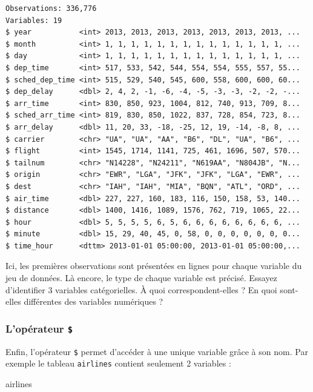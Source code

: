 \documentclass[a4paperpaper,]{article}
\newenvironment{Shaded}{\begin{snugshade}}{\end{snugshade}}
\newcommand{\NormalTok}[1]{\textcolor[rgb]{0.12,0.11,0.11}{#1}}
\begin{document}
\begin{verbatim}
Observations: 336,776
Variables: 19
$ year           <int> 2013, 2013, 2013, 2013, 2013, 2013, 2013, ...
$ month          <int> 1, 1, 1, 1, 1, 1, 1, 1, 1, 1, 1, 1, 1, 1, ...
$ day            <int> 1, 1, 1, 1, 1, 1, 1, 1, 1, 1, 1, 1, 1, 1, ...
$ dep_time       <int> 517, 533, 542, 544, 554, 554, 555, 557, 55...
$ sched_dep_time <int> 515, 529, 540, 545, 600, 558, 600, 600, 60...
$ dep_delay      <dbl> 2, 4, 2, -1, -6, -4, -5, -3, -3, -2, -2, -...
$ arr_time       <int> 830, 850, 923, 1004, 812, 740, 913, 709, 8...
$ sched_arr_time <int> 819, 830, 850, 1022, 837, 728, 854, 723, 8...
$ arr_delay      <dbl> 11, 20, 33, -18, -25, 12, 19, -14, -8, 8, ...
$ carrier        <chr> "UA", "UA", "AA", "B6", "DL", "UA", "B6", ...
$ flight         <int> 1545, 1714, 1141, 725, 461, 1696, 507, 570...
$ tailnum        <chr> "N14228", "N24211", "N619AA", "N804JB", "N...
$ origin         <chr> "EWR", "LGA", "JFK", "JFK", "LGA", "EWR", ...
$ dest           <chr> "IAH", "IAH", "MIA", "BQN", "ATL", "ORD", ...
$ air_time       <dbl> 227, 227, 160, 183, 116, 150, 158, 53, 140...
$ distance       <dbl> 1400, 1416, 1089, 1576, 762, 719, 1065, 22...
$ hour           <dbl> 5, 5, 5, 5, 6, 5, 6, 6, 6, 6, 6, 6, 6, 6, ...
$ minute         <dbl> 15, 29, 40, 45, 0, 58, 0, 0, 0, 0, 0, 0, 0...
$ time_hour      <dttm> 2013-01-01 05:00:00, 2013-01-01 05:00:00,...
\end{verbatim}

Ici, les premières observations sont présentées en lignes pour chaque variable du jeu de données. Là encore, le type de chaque variable est précisé. Essayez d'identifier 3 variables catégorielles. À quoi correspondent-elles ? En quoi sont-elles différentes des variables numériques ?

\hypertarget{loperateur}{%
\subsubsection{\texorpdfstring{L'opérateur \texttt{\$}}{L'opérateur \$}}\label{loperateur}}

Enfin, l'opérateur \texttt{\$} permet d'accéder à une unique variable grâce à son nom. Par exemple le tableau \texttt{airlines} contient seulement 2 variables :

\begin{Shaded}
\begin{Highlighting}[]
\NormalTok{airlines}
\end{Highlighting}
\end{Shaded}
\end{document}
